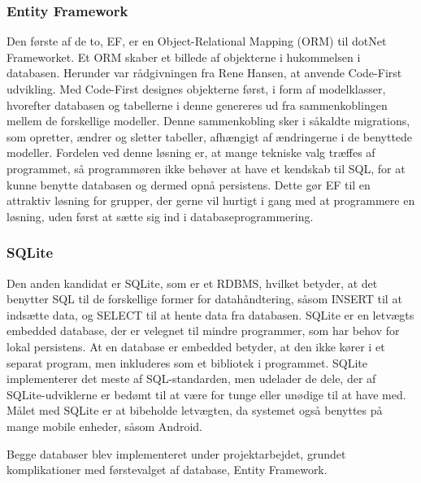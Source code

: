 \subsubsection*{Entity Framework}
Den første af de to, \ac{EF}, er en Object-Relational Mapping (ORM) til dotNet Frameworket.
Et ORM skaber et billede af objekterne i hukommelsen i databasen. 
Herunder var rådgivningen fra Rene Hansen, at anvende Code-First udvikling.
Med Code-First designes objekterne først, i form af modelklasser, hvorefter databasen og tabellerne i denne genereres ud fra sammenkoblingen mellem de forskellige modeller. 
Denne sammenkobling sker i såkaldte migrations, som opretter, ændrer og sletter tabeller, afhængigt af ændringerne i de benyttede modeller.
Fordelen ved denne løsning er, at mange tekniske valg træffes af programmet, så programmøren ikke behøver at have et kendskab til \ac{SQL}, for at kunne benytte databasen og dermed opnå persistens.
Dette gør \ac{EF} til en attraktiv løsning for grupper, der gerne vil hurtigt i gang med at programmere en løsning, uden først at sætte sig ind i databaseprogrammering.

\subsubsection*{SQLite}
Den anden kandidat er SQLite, som er et \ac{RDBMS}, hvilket betyder, at det benytter \ac{SQL} til de forskellige former for datahåndtering, såsom INSERT til at indsætte data, og SELECT til at hente data fra databasen.
SQLite er en letvægts embedded database, der er velegnet til mindre programmer, som har behov for lokal persistens.
At en database er embedded betyder, at den ikke kører i et separat program, men inkluderes som et bibliotek i programmet.
SQLite implementerer det meste af SQL-standarden, men udelader de dele, der af SQLite-udviklerne er bedømt til at være for tunge eller unødige til at have med.
Målet med SQLite er at bibeholde letvægten, da systemet også benyttes på mange mobile enheder, såsom Android.

Begge databaser blev implementeret under projektarbejdet, grundet komplikationer med førstevalget af database, Entity Framework. 


